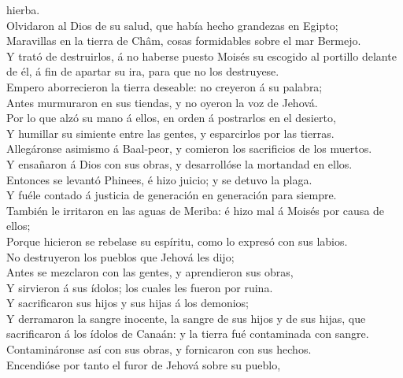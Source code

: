 hierba.\\
 Olvidaron al Dios de su salud, que había hecho grandezas
en Egipto;\\
 Maravillas en la tierra de Châm, cosas formidables sobre
el mar Bermejo.\\
 Y trató de destruirlos, á no haberse puesto Moisés su
escogido al portillo delante de él, á fin de apartar su ira, para que no
los destruyese.\\
 Empero aborrecieron la tierra deseable: no creyeron á su
palabra;\\
 Antes murmuraron en sus tiendas, y no oyeron la voz de
Jehová.\\
 Por lo que alzó su mano á ellos, en orden á postrarlos
en el desierto,\\
 Y humillar su simiente entre las gentes, y esparcirlos
por las tierras.\\
 Allegáronse asimismo á Baal-peor, y comieron los
sacrificios de los muertos.\\
 Y ensañaron á Dios con sus obras, y desarrollóse la
mortandad en ellos.\\
 Entonces se levantó Phinees, é hizo juicio; y se detuvo
la plaga.\\
 Y fuéle contado á justicia de generación en generación
para siempre.\\
 También le irritaron en las aguas de Meriba: é hizo mal
á Moisés por causa de ellos;\\
 Porque hicieron se rebelase su espíritu, como lo expresó
con sus labios.\\
 No destruyeron los pueblos que Jehová les dijo;\\
 Antes se mezclaron con las gentes, y aprendieron sus
obras,\\
 Y sirvieron á sus ídolos; los cuales les fueron por
ruina.\\
 Y sacrificaron sus hijos y sus hijas á los demonios;\\
 Y derramaron la sangre inocente, la sangre de sus hijos
y de sus hijas, que sacrificaron á los ídolos de Canaán: y la tierra fué
contaminada con sangre.\\
 Contamináronse así con sus obras, y fornicaron con sus
hechos.\\
 Encendióse por tanto el furor de Jehová sobre su pueblo,

